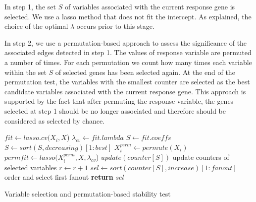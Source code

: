 In step 1, the set $S$ of variables associated with the current response gene is selected. We use a lasso method that does not fit the intercept. As explained, the choice of the optimal $\lambda$ occurs prior to this stage.

In step 2, we use a permutation-based approach to assess the significance of the associated edges detected in step 1. The values of response variable are permuted a number of times. For each permutation we count how many times each variable within the set $S$ of selected genes has been selected again. At the end of the permutation test, the variables with the smallest counter are selected as the best candidate variables associated with the current response gene. 
This approach is supported by the fact that after permuting the response variable, the genes selected at step 1 should be no longer associated and therefore should be considered as selected by chance. 


\begin{algorithm}
 \begin{algorithmic}[1]
 \State $fit \gets lasso.cv(X_i,X$)
 \State $\lambda_{cv} \gets fit.lambda$
 \State $S \gets fit.coeffs$
 \State $S \gets sort(S, decreasing)[1:best] $ 
 \State $X^{perm}_i \gets permute(X_i)$
 \State $permfit \gets lasso(X^{perm}_i, X, \lambda_{cv}$)
 \State $update(counter[S])$  update counters of selected variables 
 \State $r\gets r+1$
 \EndWhile
 \State $sel\gets sort(counter[S], increase)[1:fanout] $ order and select first fanout
 \State \textbf{return} $sel$ 
 \EndProcedure
 \end{algorithmic}
 \caption{Variable selection and permutation-based stability test}
 \label{algo:perm}
\end{algorithm}

